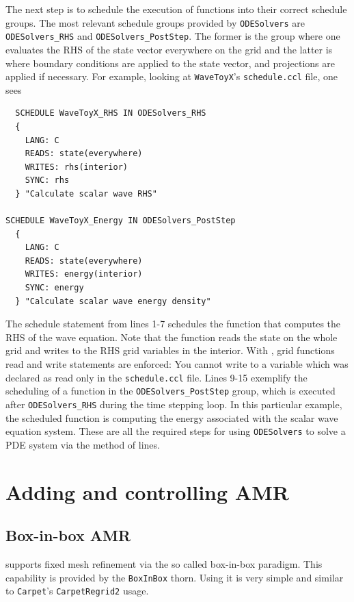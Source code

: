 The next step is to schedule the execution of functions into their correct schedule groups. The most relevant schedule groups provided by \texttt{ODESolvers} are \texttt{ODESolvers\_RHS} and \texttt{ODESolvers\_PostStep}. The former is the group where one evaluates the RHS of the state vector everywhere on the grid and the latter is where boundary conditions are applied to the state vector, and projections are applied if necessary. For example, looking at \texttt{WaveToyX}'s \texttt{schedule.ccl} file, one sees

\begin{verbatim}
  SCHEDULE WaveToyX_RHS IN ODESolvers_RHS
  {
    LANG: C
    READS: state(everywhere)
    WRITES: rhs(interior)
    SYNC: rhs
  } "Calculate scalar wave RHS"

SCHEDULE WaveToyX_Energy IN ODESolvers_PostStep
  {
    LANG: C
    READS: state(everywhere)
    WRITES: energy(interior)
    SYNC: energy
  } "Calculate scalar wave energy density"
\end{verbatim}

The schedule statement from lines 1-7 schedules the function that computes the RHS of the wave equation. Note that the function reads the state on the whole grid and writes to the RHS grid variables in the interior. With \CarpetX, grid functions read and write statements are enforced: You cannot write to a variable which was declared as read only in the \texttt{schedule.ccl} file. Lines 9-15 exemplify the scheduling of a function in the \texttt{ODESolvers\_PostStep} group, which is executed after \texttt{ODESolvers\_RHS} during the time stepping loop. In this particular example, the scheduled function is computing the energy associated with the scalar wave equation system. These are all the required steps for using \texttt{ODESolvers} to solve a PDE system via the method of lines.

\section{Adding and controlling AMR}
\label{sec:amr}


\subsection{Box-in-box AMR}
\label{sec:box_in_box_amr}
\CarpetX\space supports fixed mesh refinement via the so called box-in-box paradigm. This capability is provided by the \texttt{BoxInBox} thorn. Using it is very simple and similar to \texttt{Carpet}'s \texttt{CarpetRegrid2} usage.

